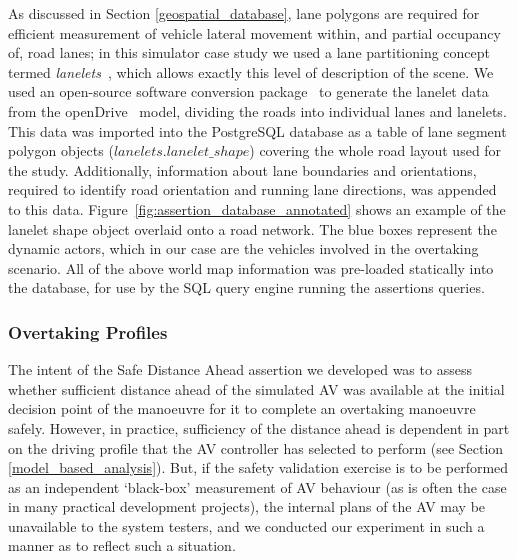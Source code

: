 
As discussed in Section \ref{geospatial_database}, lane polygons are required for efficient measurement of vehicle lateral movement within, and partial occupancy of, road lanes; in this simulator case study we used a lane partitioning concept termed \textit{lanelets}~\cite{lanelets2014}, which allows exactly this level of description of the scene. We used an open-source software conversion package~\cite{lanelets_to_openDrive} to generate the lanelet data from the openDrive~\cite{opendrive} model, dividing the roads into individual lanes and lanelets. This data was imported into the PostgreSQL database as a table of lane segment polygon objects ($lanelets.lanelet\_shape$) covering the whole road layout used for the study. Additionally, information about lane boundaries and orientations, required to identify road orientation and running lane directions, was appended to this data. 
%
Figure~\ref{fig:assertion_database_annotated} shows an example of the lanelet shape object overlaid onto a road network. The blue boxes represent the dynamic actors, which in our case are the vehicles involved in the overtaking scenario. 
%
All of the above world map information was pre-loaded statically into the database, for use by the SQL query engine running the assertions queries.%

\subsubsection{Overtaking Profiles} \label{overtaking_profiles}
The intent of the Safe Distance Ahead assertion we developed was to assess whether sufficient distance ahead of the simulated AV was available at the initial decision point of the manoeuvre for it to complete an overtaking manoeuvre safely. However, in practice, sufficiency of the distance ahead is dependent in part on the driving profile that the AV controller has selected to perform (see Section \ref{model_based_analysis}). But, if the safety validation exercise is to be performed as an independent `black-box' measurement of AV behaviour (as is often the case in many practical development projects), the internal plans of the AV may be unavailable to the system testers, and we conducted our experiment in such a manner as to reflect such a situation.

